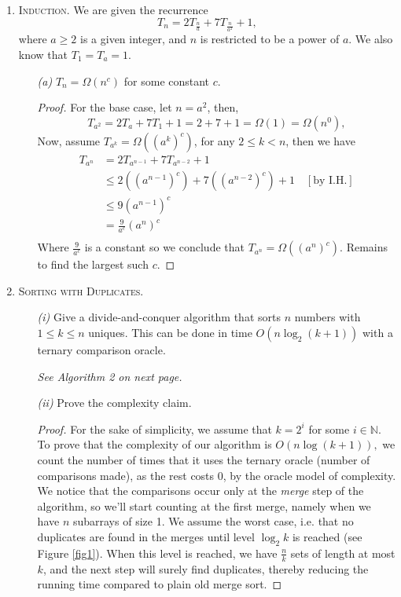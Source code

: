 \documentclass[12pt]{article}
\theoremstyle{definition}
\theoremstyle{remark}
\begin{document}
\begin{enumerate}
\newpage 
  \item \textsc{Induction.} We are given the recurrence 
  $$T_n = 2 T_{\frac{n}{a}} + 7 T_{\frac{n}{a^2}} + 1,$$
  where $a \geq 2$ is a given integer, and $n$ is restricted to be a power of $a$. We also know that $T_1 = T_a = 1$.\newline
  \begin{enumerate}
    \item[\it (a)] $T_n = \Omega(n^c)$ for some constant $c.$
\begin{proof} For the base case, let $n = a^2$, then, 
  $$T_{a^2} = 2 T_a + 7T_1 + 1 = 2 + 7  + 1 = \Omega(1) = \Omega(n^0), $$
  Now, assume $T_{a^k} = \Omega ((a^k)^c)$, for any $2\leq k < n$, then we have 
  \begin{equation*}
    \begin{split}
      T_{a^n} &= 2 T_{a^{n-1}} + 7T_{a^{n-2}} + 1\\ 
      &\leq 2 ((a^{n-1})^c) + 7((a^{n-2})^c) + 1 \quad [\text{by I.H.}]\\ 
      & \leq 9 (a^{n-1})^c \\
      & = \frac{9}{a^c} \left( a^n\right)^c \\ 
    \end{split}
  \end{equation*}
  Where $\frac{9}{a^c} $ is a constant so we conclude that $T_{a^n} = \Omega ((a^n)^c)$. Remains to find the largest such $c.$
\end{proof}
  \end{enumerate}
  \newpage
  \item  \textsc{Sorting with Duplicates.} \begin{enumerate}
    \item[\it (i)] Give a divide-and-conquer algorithm that sorts $n$ numbers with $1\leq k\leq n$ uniques. This can be done in time $O(n \log_2(k + 1))$ with a ternary comparison oracle. 
    
    \textit{See Algorithm 2 on next page.}
   \item[\it (ii)] Prove the complexity claim.
   \begin{proof} 
     For the sake of simplicity, we assume that $k = 2^i$ for some $i \in \mathbb{N}$. To prove that the complexity of our algorithm is $O(n \log(k+1)),$ we count the number of times that it uses the ternary oracle (number of comparisons made), as the rest costs 0, by the oracle model of complexity. We notice that the comparisons occur only at the \textit{merge} step of the algorithm, so we'll start counting at the first merge, namely when we have $n$ subarrays of size 1. We assume the worst case, i.e. that no duplicates are found in the merges until level $\log_2k$ is reached (see Figure \ref{fig1}). When this level is reached, we have $\frac{n}{k}$ sets of length at most $k$, and the next step will surely find duplicates, thereby reducing the running time compared to plain old merge sort. 
     


\end{proof}
\end{enumerate}
\end{enumerate}
\end{document}
